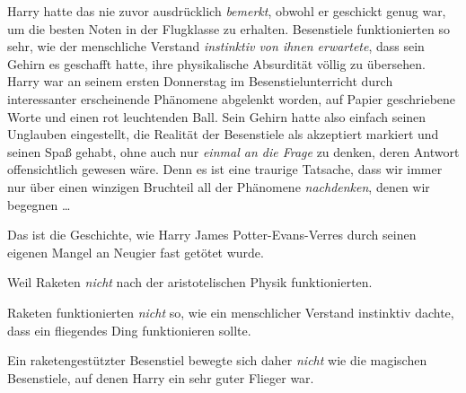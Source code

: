 Harry hatte das nie zuvor ausdrücklich \emph{bemerkt}, obwohl er geschickt genug war, um die besten Noten in der Flugklasse zu erhalten. Besenstiele funktionierten so sehr, wie der menschliche Verstand \emph{instinktiv von ihnen erwartete}, dass sein Gehirn es geschafft hatte, ihre physikalische Absurdität völlig zu übersehen. Harry war an seinem ersten Donnerstag im Besenstielunterricht durch interessanter erscheinende Phänomene abgelenkt worden, auf Papier geschriebene Worte und einen rot leuchtenden Ball. Sein Gehirn hatte also einfach seinen Unglauben eingestellt, die Realität der Besenstiele als akzeptiert markiert und seinen Spaß gehabt, ohne auch nur \emph{einmal an die Frage} zu denken, deren Antwort offensichtlich gewesen wäre. Denn es ist eine traurige Tatsache, dass wir immer nur über einen winzigen Bruchteil all der Phänomene \emph{nachdenken}, denen wir begegnen …

Das ist die Geschichte, wie Harry James Potter-Evans-Verres durch seinen eigenen Mangel an Neugier fast getötet wurde.

Weil Raketen \emph{nicht} nach der aristotelischen Physik funktionierten.

Raketen funktionierten \emph{nicht} so, wie ein menschlicher Verstand instinktiv dachte, dass ein fliegendes Ding funktionieren sollte.

Ein raketengestützter Besenstiel bewegte sich daher \emph{nicht} wie die magischen Besenstiele, auf denen Harry ein sehr guter Flieger war.

